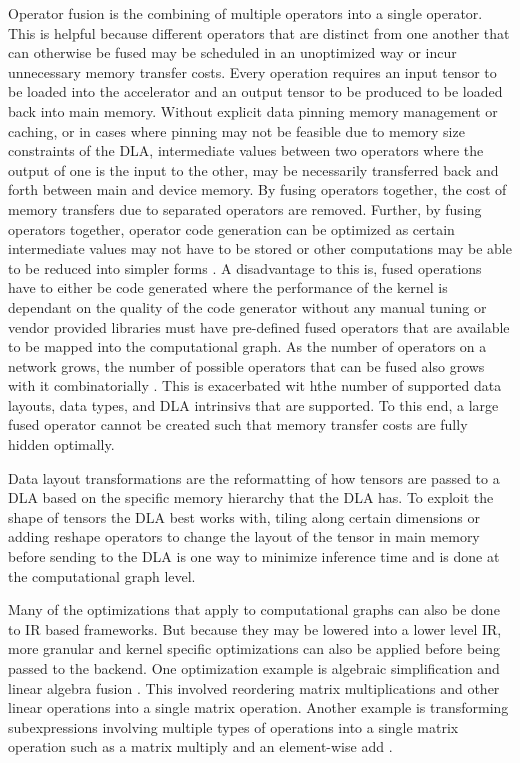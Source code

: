 Operator fusion is the combining of multiple operators into a single operator.
This is helpful because different operators that are distinct from one another
that can otherwise be fused may be scheduled in an unoptimized way or incur
unnecessary memory transfer costs. Every operation requires an input tensor to
be loaded into the accelerator and an output tensor to be produced to be loaded
back into main memory. Without explicit data pinning memory management or
caching, or in cases where pinning may not be feasible due to memory size
constraints of the DLA, intermediate values between two operators where the
output of one is the input to the other, may be necessarily transferred back
and forth between main and device memory. By fusing operators together,
the cost of memory transfers due to separated operators are removed.
Further, by fusing operators together, operator code generation can
be optimized as certain intermediate values may not have to be stored or other
computations may be able to be reduced into simpler forms \cite{TVM} \cite{ONNX}.
A disadvantage to this is, fused operations have to either be code generated
where the performance of the kernel is dependant on the quality of the code
generator without any manual tuning or vendor provided libraries must have
pre-defined fused operators that are available to be mapped into the computational
graph. As the number of operators on a network grows, the number of possible
operators that can be fused also grows with it combinatorially \cite{TVM}.
This is exacerbated wit hthe number of supported data layouts, data types, 
and DLA intrinsivs that are supported. To this end, a large fused operator
cannot be created such that memory transfer costs are fully hidden optimally.

Data layout transformations are the reformatting of how tensors are passed
to a DLA based on the specific memory hierarchy that the DLA has. To exploit
the shape of tensors the DLA best works with, tiling along certain dimensions or
adding reshape operators to change the layout of the tensor in main memory before
sending to the DLA is one way to minimize inference time and is done at the
computational graph level.

Many of the optimizations that apply to computational graphs can also be done
to IR based frameworks. But because they may be lowered into a lower level IR,
more granular and kernel specific optimizations can also be applied before
being passed to the backend. One optimization example is algebraic
simplification and linear algebra fusion \cite{DLVM}. This involved reordering
matrix multiplications and other linear operations into a single matrix
operation. Another example is transforming subexpressions involving multiple
types of operations into a single matrix operation such as a matrix multiply
and an element-wise add \cite{DLVM}.

